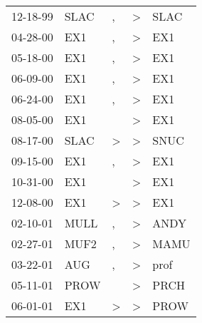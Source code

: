 \begin{supertabular}{p{0.07\textwidth}p{0.06\textwidth}p{0.02\textwidth}p{0.02\textwidth}p{0.06\textwidth}}
          12-18-99\textsuperscript{} &          SLAC\textsuperscript{} &             , &     \textgreater &  SLAC\textsuperscript{} \\
          04-28-00\textsuperscript{} &           EX1\textsuperscript{} &             , &     \textgreater &   EX1\textsuperscript{} \\
          05-18-00\textsuperscript{} &           EX1\textsuperscript{} &             , &     \textgreater &   EX1\textsuperscript{} \\
          06-09-00\textsuperscript{} &           EX1\textsuperscript{} &             , &     \textgreater &   EX1\textsuperscript{} \\
          06-24-00\textsuperscript{} &           EX1\textsuperscript{} &             , &     \textgreater &   EX1\textsuperscript{} \\
          08-05-00\textsuperscript{} &           EX1\textsuperscript{} &               &     \textgreater &   EX1\textsuperscript{} \\
          08-17-00\textsuperscript{} &          SLAC\textsuperscript{} &  \textgreater &     \textgreater &  SNUC\textsuperscript{} \\
          09-15-00\textsuperscript{} &           EX1\textsuperscript{} &             , &     \textgreater &   EX1\textsuperscript{} \\
          10-31-00\textsuperscript{} &           EX1\textsuperscript{} &               &     \textgreater &   EX1\textsuperscript{} \\
          12-08-00\textsuperscript{} &           EX1\textsuperscript{} &  \textgreater &     \textgreater &   EX1\textsuperscript{} \\
          02-10-01\textsuperscript{} &          MULL\textsuperscript{} &             , &     \textgreater &  ANDY\textsuperscript{} \\
          02-27-01\textsuperscript{} &          MUF2\textsuperscript{} &             , &     \textgreater &  MAMU\textsuperscript{} \\
          03-22-01\textsuperscript{} &           AUG\textsuperscript{} &             , &     \textgreater &  prof\textsuperscript{} \\
          05-11-01\textsuperscript{} &          PROW\textsuperscript{} &               &     \textgreater &  PRCH\textsuperscript{} \\
          06-01-01\textsuperscript{} &           EX1\textsuperscript{} &  \textgreater &     \textgreater &  PROW\textsuperscript{} \\

\end{supertabular}
